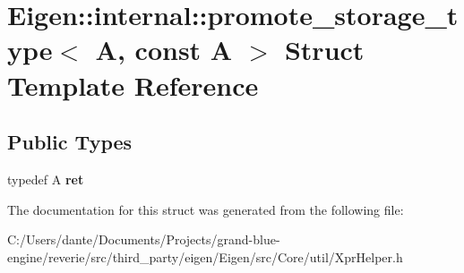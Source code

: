 \hypertarget{struct_eigen_1_1internal_1_1promote__storage__type_3_01_a_00_01const_01_a_01_4}{}\section{Eigen\+::internal\+::promote\+\_\+storage\+\_\+type$<$ A, const A $>$ Struct Template Reference}
\label{struct_eigen_1_1internal_1_1promote__storage__type_3_01_a_00_01const_01_a_01_4}
\subsection*{Public Types}
\begin{DoxyCompactItemize}
\item 
\mbox{\label{struct_eigen_1_1internal_1_1promote__storage__type_3_01_a_00_01const_01_a_01_4_a467ead79b4ebc007504bc2560a556094}} 
typedef A {\bfseries ret}
\end{DoxyCompactItemize}


The documentation for this struct was generated from the following file\+:\begin{DoxyCompactItemize}
\item 
C\+:/\+Users/dante/\+Documents/\+Projects/grand-\/blue-\/engine/reverie/src/third\+\_\+party/eigen/\+Eigen/src/\+Core/util/Xpr\+Helper.\+h\end{DoxyCompactItemize}
